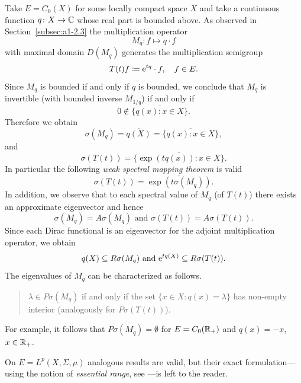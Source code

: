\begin{example}\label{ex:a3-2.3}%
Take $E = C_{0}(X)$ for some locally compact space $X$ and take a continuous function $q \colon X \to \mathbb{C}$ whose real part is bounded above.
As observed in Section~\ref{subsec:a1-2.3} the multiplication operator
\[
M_{q} \colon f \mapsto q \cdot f
\]
with maximal domain $D(M_{q})$ generates the multiplication semigroup
\[
T(t)f \coloneq \mathrm{e}^{tq} \cdot f, \quad f \in E .
\]
Since $M_{q}$ is bounded if and only if\/ $q$ is bounded, we conclude that $M_{q}$ is invertible (with bounded inverse $M_{1/q}$) if and only if
\[
0 \notin \overline{\{q(x)  \colon x \in X\}} .
\]
Therefore we obtain
\[
\sigma(M_{q}) = \overline{q(X)} = \overline{\{q(x) \colon x \in X\}} ,
\]
and
\[
\sigma(T(t)) = \overline{\{\exp(tq(x)) \colon x \in X\}} .
\]
In particular the following \emph{weak spectral mapping theorem}
is valid
\[
\sigma(T(t)) = \overline{\exp(t\sigma(M_{q}))} .
\]
In addition, we observe that to each spectral value of\/ $M_{q}$ (\resp of\/ $T(t)$) there exists an approximate eigenvector and hence
\[
\sigma(M_{q}) = A\sigma(M_{q}) \text{ and } \sigma(T(t)) = A\sigma(T(t)) .
\]
Since each Dirac functional is an eigenvector for the adjoint multiplication operator, we obtain
\[
q(X) \subseteq R\sigma(M_{q}) \text{ and } \mathrm{e}^{tq(X)} \subseteq R\sigma(T(t)) .
\]
The eigenvalues of\/ $M_{q}$ can be characterized as follows.
\begin{quote}
$\lambda \in P\sigma(M_{q})$ if and only if the set $\{x \in X \colon q(x) = \lambda\}$ has non-empty interior (analogously for $P\sigma(T(t))$).
\end{quote}
For example, it follows that $P\sigma(M_{q}) = \emptyset$ for $E = C_{0}(\mathbb{R}_{+})$ and $q(x) = -x$, $x \in \mathbb{R}_{+}$.

On $E = L^{p}(X,\Sigma,\mu)$ analogous results are valid, but their exact formulation---using the notion of \emph{essential range}, see \textcite{goldstein:1985a}---is left to the reader.
\end{example}
